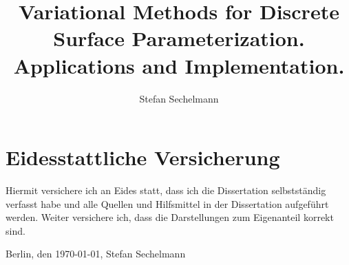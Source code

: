 \documentclass[11pt]{article}
\title{Variational Methods for Discrete Surface Parameterization. Applications and Implementation.}
\author{Stefan Sechelmann}
\begin{document}
\maketitle

\section*{Eidesstattliche Versicherung}
Hiermit versichere ich an Eides statt, dass ich die Dissertation selbstständig verfasst habe und alle Quellen und Hilfsmittel in der Dissertation aufgeführt werden.
Weiter versichere ich, dass die Darstellungen zum Eigenanteil korrekt sind.

\vspace{2.5cm}
Berlin, den \today, Stefan Sechelmann
\end{document}
